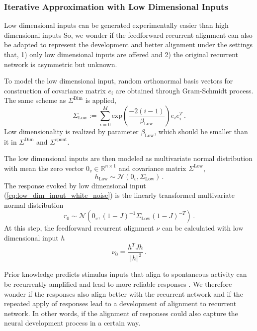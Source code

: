 \documentclass[11pt]{article}
\begin{document}
{	\subsubsection{Iterative Approximation with Low Dimensional Inputs} \label{sec:repeat_low_dim_inputs}
	Low dimensional inputs can be generated experimentally easier than high dimensional inputs %
	So, we wonder if the feedforward recurrent alignment can also be adapted to represent the development and better alignment under the settings that, 1) only low dimensional inputs are offered and 2) the original recurrent network is asymmetric but unknown.
	
	To model the low dimensional input, random orthonormal basis vectors for construction of covariance matrix $e_i$ are obtained through Gram-Schmidt process. The same scheme as $\Sigma^{\text{Dim}}$ is applied, 
		\begin{equation}
			\Sigma_{\text{Low}} := \sum_{i=0}^{M} \text{exp}\left(\frac{-2(i-1)}{\beta_{\text{Low}}}\right) e_i e_i^T \, .
		\end{equation}
	Low dimensionality is realized by parameter $\beta_{\text{Low}}$, which should be smaller than it in $\Sigma^{\text{Dim}}$ and $\Sigma^{\text{spont}}$.
	
	The low dimensional inputs are then modeled as multivariate normal distribution with mean the zero vector $0_v \in \mathbb{R}^{n \times 1}$ and covariance matrix $\Sigma^{\text{Low}}$, 
		\begin{equation} \label{eq:low_dim_input_white_noise}
			h_{\text{Low}} \sim \mathcal{N}(0_v, \Sigma_{\text{Low}}) \, .
		\end{equation}
	The response evoked by low dimensional input (\ref{eq:low_dim_input_white_noise}) is the linearly transformed multivariate normal distribution
		\begin{equation}
			r_0 \sim \mathcal{N}\left( 0_v, (1-J)^{-1} \Sigma_{\text{Low}} (1-J)^{-T} \right) \, .
		\end{equation}
	At this step, the feedforward recurrent alignment $\nu$ can be calculated with low dimensional input $h$ 
		\begin{equation} \label{eq:repeat_low_dim_ffrec}
			\nu_0 = \frac{h^T J h}{\Vert h \Vert^2} \,.
		\end{equation} 
	
	Prior knowledge predicts stimulus inputs that align to spontaneous activity can be recurrently amplified and lead to more reliable responses \cite{mulholland2023selective}. 
	We therefore wonder if the responses also align better with the recurrent network and if the repeated apply of responses lead to a development of alignment to recurrent network. In other words, if the alignment of responses could also capture the neural development process in a certain way.
	
}
\end{document}
